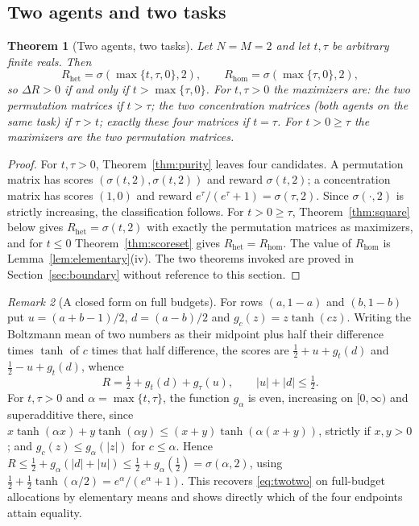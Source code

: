 \documentclass[11pt]{article}
\theoremstyle{plain}
\newtheorem{theorem}{Theorem}[section]
\theoremstyle{definition}
\theoremstyle{remark}
\newtheorem{remark}[theorem]{Remark}
\newcommand{\Rhet}{R_{\mathrm{het}}}
\newcommand{\Rhom}{R_{\mathrm{hom}}}
\newcommand{\sig}{\sigma}
\begin{document}
\subsection{Two agents and two tasks}\label{sec:twotwo}

\begin{theorem}[Two agents, two tasks]\label{thm:twotwo}
Let $N=M=2$ and let $t,\tau$ be arbitrary finite reals. Then
\begin{equation}\label{eq:twotwo}
 \Rhet=\sig(\max\{t,\tau,0\},2),\qquad \Rhom=\sig(\max\{\tau,0\},2),
\end{equation}
so $\Delta R>0$ if and only if $t>\max\{\tau,0\}$. For $t,\tau>0$ the maximizers are: the two permutation matrices if $t>\tau$; the two concentration matrices (both agents on the same task) if $\tau>t$; exactly these four matrices if $t=\tau$. For $t>0\ge\tau$ the maximizers are the two permutation matrices.
\end{theorem}

\begin{proof}
For $t,\tau>0$, Theorem~\ref{thm:purity} leaves four candidates. A permutation matrix has scores $(\sig(t,2),\sig(t,2))$ and reward $\sig(t,2)$; a concentration matrix has scores $(1,0)$ and reward $e^\tau/(e^\tau+1)=\sig(\tau,2)$. Since $\sig(\cdot,2)$ is strictly increasing, the classification follows. For $t>0\ge\tau$, Theorem~\ref{thm:square} below gives $\Rhet=\sig(t,2)$ with exactly the permutation matrices as maximizers, and for $t\le0$ Theorem~\ref{thm:scoreset} gives $\Rhet=\Rhom$. The value of $\Rhom$ is Lemma~\ref{lem:elementary}(iv). The two theorems invoked are proved in Section~\ref{sec:boundary} without reference to this section.
\end{proof}

\begin{remark}[A closed form on full budgets]\label{rem:closedform}
For rows $(a,1-a)$ and $(b,1-b)$ put $u=(a+b-1)/2$, $d=(a-b)/2$ and $g_c(z)=z\tanh(cz)$. Writing the Boltzmann mean of two numbers as their midpoint plus half their difference times $\tanh$ of $c$ times that half difference, the scores are $\frac12+u+g_t(d)$ and $\frac12-u+g_t(d)$, whence
\[
 R=\tfrac12+g_t(d)+g_\tau(u),\qquad |u|+|d|\le\tfrac12 .
\]
For $t,\tau>0$ and $\alpha=\max\{t,\tau\}$, the function $g_\alpha$ is even, increasing on $[0,\infty)$ and superadditive there, since $x\tanh(\alpha x)+y\tanh(\alpha y)\le(x+y)\tanh(\alpha(x+y))$, strictly if $x,y>0$; and $g_c(z)\le g_\alpha(|z|)$ for $c\le\alpha$. Hence $R\le\frac12+g_\alpha(|d|+|u|)\le\frac12+g_\alpha(\frac12)=\sig(\alpha,2)$, using $\frac12+\frac12\tanh(\alpha/2)=e^\alpha/(e^\alpha+1)$. This recovers \eqref{eq:twotwo} on full-budget allocations by elementary means and shows directly which of the four endpoints attain equality.
\end{remark}
\end{document}
